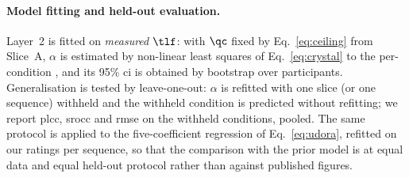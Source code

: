 \paragraph{Model fitting and held-out evaluation.}
Layer~2 is fitted on \emph{measured} $\tlf$: with $\qc$ fixed by
Eq.~\eqref{eq:ceiling} from Slice~A, $\alpha$ is estimated by
non-linear least squares of Eq.~\eqref{eq:crystal} to the
per-condition \mos, and its 95\% \gls{ci} is obtained by bootstrap
over participants. Generalisation is tested by leave-one-out: $\alpha$
is refitted with one slice (or one sequence) withheld and the withheld
condition is predicted without refitting; we report \gls{plcc},
\gls{srocc} and \gls{rmse} on the withheld conditions, pooled. The same
protocol is applied to the five-coefficient regression of
Eq.~\eqref{eq:udora}, refitted on our ratings per sequence, so that
the comparison with the prior model is at equal data and equal
held-out protocol rather than against published figures.
